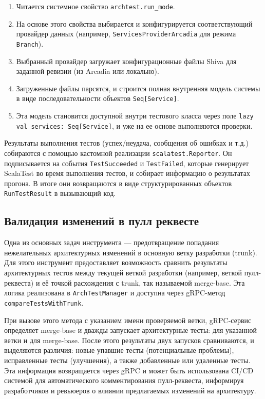 \begin{enumerate}
    \item Читается системное свойство \verb|archtest.run_mode|.
    \item На основе этого свойства выбирается и конфигурируется соответствующий провайдер данных (например, \verb|ServicesProviderArcadia| для режима \verb|Branch|).
    \item Выбранный провайдер загружает конфигурационные файлы Shiva для заданной ревизии (из Arcadia или локально).
    \item Загруженные файлы парсятся, и строится полная внутренняя модель системы в виде последовательности объектов \verb|Seq[Service]|.
    \item Эта модель становится доступной внутри тестового класса через поле \verb|lazy val services: Seq[Service]|, и уже на ее основе выполняются проверки.
\end{enumerate}

Результаты выполнения тестов (успех/неудача, сообщения об ошибках и т.д.) собираются с помощью кастомной реализации \verb|scalatest.Reporter|. Он подписывается на события \verb|TestSucceeded| и \verb|TestFailed|, которые генерирует ScalaTest во время выполнения тестов, и собирает информацию о результатах прогона. В итоге они возвращаются в виде структурированных объектов \verb|RunTestResult| в вызывающий код.

\subsection{Валидация изменений в пулл реквесте}

Одна из основных задач инструмента — предотвращение попадания нежелательных архитектурных изменений в основную ветку разработки (trunk). Для этого инструмент предоставляет возможность сравнить результаты архитектурных тестов между текущей веткой разработки (например, веткой пулл-реквеста) и её точкой расхождения с trunk, так называемой merge-base. Эта логика реализована в \verb|ArchTestManager| и доступна через gRPC-метод \verb|compareTestsWithTrunk|.

При вызове этого метода с указанием имени проверяемой ветки, gRPC-сервис определяет merge-base и дважды запускает архитектурные тесты: для указанной ветки и для merge-base. После этого результаты двух запусков сравниваются, и выделяются различия: новые упавшие тесты (потенциальные проблемы), исправленные тесты (улучшения), а также добавленные или удаленные тесты. Эта информация возвращается через gRPC и может быть использована CI/CD системой для автоматического комментирования пулл-реквеста, информируя разработчиков и ревьюеров о влиянии предлагаемых изменений на архитектуру.

